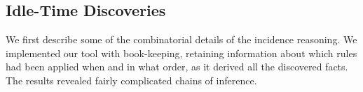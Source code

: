 \subsection{Idle-Time Discoveries}\label{sec:IdleTimeDiscoveries}
We first describe some of the combinatorial details of the incidence reasoning. We implemented our tool with book-keeping, retaining information about which rules had been applied when and in what order, as it derived all the discovered facts. The results revealed fairly complicated chains of inference. 

\begin{figure}


\end{figure}
